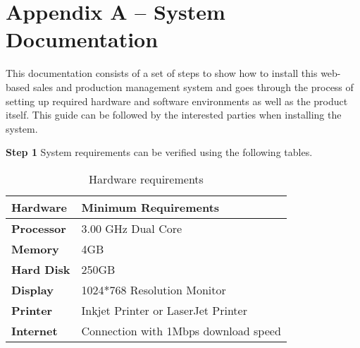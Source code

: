 \documentclass[12pt]{report}
\begin{document}

\newpage
{}
\singlespacing
\printbibliography[title={References}]


\renewcommand\thechapter{\Alph{chapter}}
\renewcommand\thesection{\thechapter.\arabic{section}}
\setcounter{chapter}{0}
\setcounter{section}{0}

\chapter*{Appendix A – System Documentation}
This documentation consists of a set of steps to show how to install this web-based sales and production management system and goes through the process of setting up required hardware and software environments as well as the product itself. This guide can be followed by the interested parties when installing the system.

\noindent
\large{\bf{Step 1}}\newline
System requirements can be verified using the following tables.

\begin{table}[H]
	\centering
	\begin{tabular}{ | p{2.5cm} | p{8.5cm} |}
		\hline
		\bf{Hardware}  & \bf{Minimum Requirements}            \\
		\hline
		\bf{Processor} & 3.00 GHz Dual Core                   \\
		\hline
		\bf{Memory}    & 4GB                                  \\
		\hline
		\bf{Hard Disk} & 250GB                                \\
		\hline
		\bf{Display}   & 1024*768 Resolution Monitor          \\
		\hline
		\bf{Printer}   & Inkjet Printer or LaserJet Printer   \\
		\hline
		\bf{Internet}  & Connection with 1Mbps download speed \\
		\hline
	\end{tabular}
	\caption{Hardware requirements}
\end{table}
\end{document}
